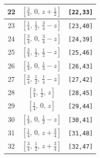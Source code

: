 \documentclass[fleqn,8pt]{jsarticle}
\begin{document}
\begin{longtable}{ccc}
22 & $\left[ \frac{3}{4},\, 0,\, z + \frac{1}{2} \right]$ & {\tt [22,33]} \\ \hline
23 & $\left[ \frac{1}{4},\, \frac{1}{2},\, \frac{3}{4} - z \right]$ & {\tt [23,40]} \\ \hline
24 & $\left[ \frac{3}{4},\, 0,\, \frac{3}{4} - z \right]$ & {\tt [24,39]} \\ \hline
25 & $\left[ \frac{3}{4},\, \frac{1}{2},\, \frac{1}{2} - z \right]$ & {\tt [25,46]} \\ \hline
26 & $\left[ \frac{1}{4},\, 0,\, \frac{1}{4} - z \right]$ & {\tt [26,43]} \\ \hline
27 & $\left[ \frac{3}{4},\, \frac{1}{2},\, \frac{1}{4} - z \right]$ & {\tt [27,42]} \\ \hline
28 & $\left[ \frac{3}{4},\, \frac{1}{2},\, z \right]$ & {\tt [28,45]} \\ \hline
29 & $\left[ \frac{1}{4},\, 0,\, z \right]$ & {\tt [29,44]} \\ \hline
30 & $\left[ \frac{1}{4},\, 0,\, \frac{1}{2} - z \right]$ & {\tt [30,41]} \\ \hline
31 & $\left[ \frac{1}{4},\, 0,\, z + \frac{3}{4} \right]$ & {\tt [31,48]} \\ \hline
32 & $\left[ \frac{3}{4},\, \frac{1}{2},\, z + \frac{3}{4} \right]$ & {\tt [32,47]} \\
\end{longtable}
\renewcommand{\arraystretch}{1.2}
\end{document}
